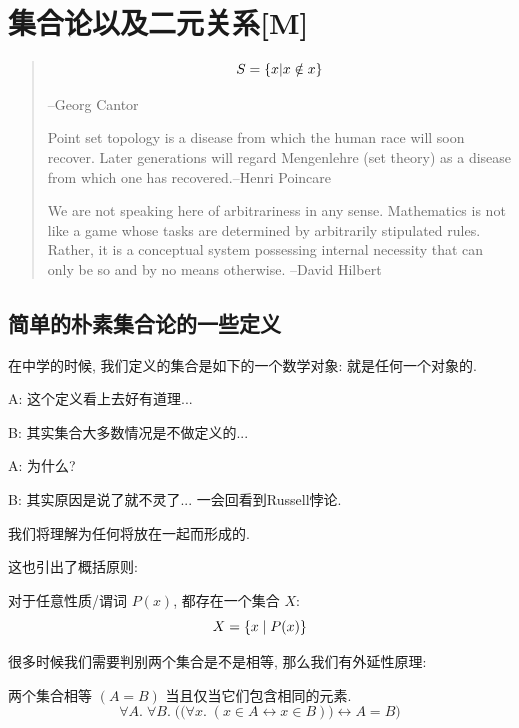 \chapter{集合论以及二元关系[M]}

\begin{quote}
	$$S=\{x|x\notin x\}$$
	
	\hfill --Georg Cantor

	Point set topology is a disease from which the human race will soon recover. Later generations will regard Mengenlehre (set theory) as a disease from which one has recovered.\hfill --Henri Poincare
	
	We are not speaking here of arbitrariness in any sense. Mathematics is not like a game whose tasks are determined by arbitrarily stipulated rules. Rather, it is a conceptual system possessing internal necessity that can only be so and by no means otherwise. \hfill --David Hilbert
\end{quote}

\section{简单的朴素集合论的一些定义}

在中学的时候, 我们定义的集合是如下的一个数学对象: 就是任何一个对象的. 

\begin{dialogue}
	A: 这个定义看上去好有道理...
	
	B: 其实集合大多数情况是不做定义的...
	
	A: 为什么?
	
	B: 其实原因是说了就不灵了... 一会回看到Russell悖论. 
\end{dialogue}

\begin{definition}[集合]
    我们将理解为任何将放在一起而形成的. 
\end{definition}

这也引出了概括原则: 

\begin{theorem}[概括原则]
    对于任意性质/谓词 $P(x)$, 都存在一个集合 $X$:
    \[
      X = \{x \mid P(x)\}
    \]
\end{theorem}

很多时候我们需要判别两个集合是不是相等, 那么我们有外延性原理: 
\begin{definition}
    两个集合相等 $(A = B)$ 当且仅当它们包含相同的元素. 
    \[
      \forall A.\; \forall B.\;
        \Big(\big(\forall x.\; (x \in A \leftrightarrow x \in B)\big)
          \leftrightarrow A = B \Big)
    \]
\end{definition}

